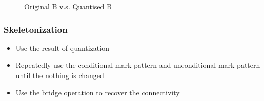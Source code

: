 \documentclass{article}
\begin{document}
\begin{figure}
\caption{Original B v.s. Quantised B}
\end{figure}

\subsubsection{Skeletonization}
\begin{itemize}
\item Use the result of quantization
\item Repeatedly use the conditional mark pattern and unconditional mark pattern until the nothing is changed
\item Use the bridge operation to recover the connectivity
\end{itemize}
\end{document}
